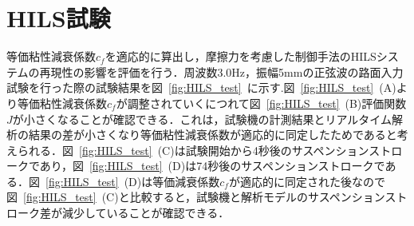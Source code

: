 \documentclass{article_vdlab_sotsuron_youshi}
\begin{document}
  \section{HILS試験}
  等価粘性減衰係数$c_f$を適応的に算出し，摩擦力を考慮した制御手法のHILSシステムの再現性の影響を評価を行う．周波数3.0Hz，振幅5mmの正弦波の路面入力試験を行った際の試験結果を図~\ref{fig:HILS_test}~に示す.図~\ref{fig:HILS_test}~(A)より等価粘性減衰係数$c_f$が調整されていくにつれて図~\ref{fig:HILS_test}~(B)評価関数$J$が小さくなることが確認できる．これは，試験機の計測結果とリアルタイム解析の結果の差が小さくなり等価粘性減衰係数が適応的に同定したためであると考えられる．図~\ref{fig:HILS_test}~(C)は試験開始から4秒後のサスペンションストロークであり，図~\ref{fig:HILS_test}~(D)は74秒後のサスペンションストロークである．図~\ref{fig:HILS_test}~(D)は等価減衰係数$c_f$が適応的に同定された後なので図~\ref{fig:HILS_test}~(C)と比較すると，試験機と解析モデルのサスペンションストローク差が減少していることが確認できる．
  \vspace{-1mm}
\end{document}
